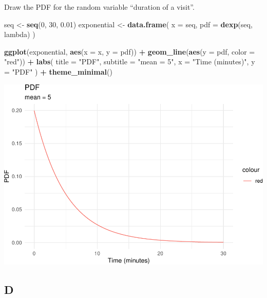 \documentclass[
]{article}
\newenvironment{Shaded}{\begin{snugshade}}{\end{snugshade}}
\newcommand{\DataTypeTok}[1]{\textcolor[rgb]{0.13,0.29,0.53}{#1}}
\newcommand{\DecValTok}[1]{\textcolor[rgb]{0.00,0.00,0.81}{#1}}
\newcommand{\FloatTok}[1]{\textcolor[rgb]{0.00,0.00,0.81}{#1}}
\newcommand{\KeywordTok}[1]{\textcolor[rgb]{0.13,0.29,0.53}{\textbf{#1}}}
\newcommand{\NormalTok}[1]{#1}
\newcommand{\OperatorTok}[1]{\textcolor[rgb]{0.81,0.36,0.00}{\textbf{#1}}}
\newcommand{\StringTok}[1]{\textcolor[rgb]{0.31,0.60,0.02}{#1}}
\begin{document}
Draw the PDF for the random variable ``duration of a visit''.

\begin{Shaded}
\begin{Highlighting}[]
\NormalTok{seq \textless{}{-}}\StringTok{ }\KeywordTok{seq}\NormalTok{(}\DecValTok{0}\NormalTok{, }\DecValTok{30}\NormalTok{, }\FloatTok{0.01}\NormalTok{)}
\NormalTok{exponential \textless{}{-}}\StringTok{ }\KeywordTok{data.frame}\NormalTok{(}
  \DataTypeTok{x =}\NormalTok{ seq,}
  \DataTypeTok{pdf =} \KeywordTok{dexp}\NormalTok{(seq, lambda)}
\NormalTok{)}

\KeywordTok{ggplot}\NormalTok{(exponential, }\KeywordTok{aes}\NormalTok{(}\DataTypeTok{x =}\NormalTok{ x, }\DataTypeTok{y =}\NormalTok{ pdf)) }\OperatorTok{+}
\StringTok{  }\KeywordTok{geom\_line}\NormalTok{(}\KeywordTok{aes}\NormalTok{(}\DataTypeTok{y =}\NormalTok{ pdf, }\DataTypeTok{color =} \StringTok{"red"}\NormalTok{)) }\OperatorTok{+}
\StringTok{  }\KeywordTok{labs}\NormalTok{(}
    \DataTypeTok{title =} \StringTok{"PDF"}\NormalTok{,}
    \DataTypeTok{subtitle =} \StringTok{"mean = 5"}\NormalTok{,}
    \DataTypeTok{x =} \StringTok{"Time (minutes)"}\NormalTok{,}
    \DataTypeTok{y =} \StringTok{"PDF"}
\NormalTok{  ) }\OperatorTok{+}
\StringTok{  }\KeywordTok{theme\_minimal}\NormalTok{()}
\end{Highlighting}
\end{Shaded}

\includegraphics{es_files/figure-latex/unnamed-chunk-15-1.pdf}

\hypertarget{d}{%
\subsection{D}\label{d}}
\end{document}
